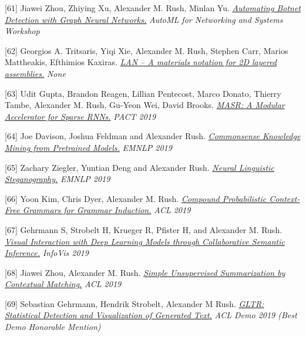 \documentclass[10pt]{article}
\begin{document}
[61] \ind Jiawei Zhou, Zhiying Xu, Alexander M. Rush, Minlan Yu. \emph{\href{ https://arxiv.org/pdf/2003.06344 }{ Automating Botnet Detection with Graph Neural Networks.} }\emph{ AutoML for Networking and Systems Workshop }

\medskip


[62] \ind Georgios A. Tritsaris, Yiqi Xie, Alexander M. Rush, Stephen Carr, Marios Mattheakis, Efthimios Kaxiras. \emph{\href{ https://arxiv.org/pdf/1910.03413 }{ LAN -- A materials notation for 2D layered assemblies.} }\emph{ None }

\medskip


[63] \ind Udit Gupta, Brandon Reagen, Lillian Pentecost, Marco Donato, Thierry Tambe, Alexander M. Rush, Gu-Yeon Wei, David Brooks. \emph{\href{ None }{ MASR: A Modular Accelerator for Sparse RNNs.} }\emph{ PACT 2019 }

\medskip


[64] \ind Joe Davison, Joshua Feldman and Alexander Rush. \emph{\href{ None }{ Commonsense Knowledge Mining from Pretrained Models.} }\emph{ EMNLP 2019 }

\medskip


[65] \ind Zachary Ziegler, Yuntian Deng and Alexander Rush. \emph{\href{ https://arxiv.org/abs/1909.01496 }{ Neural Linguistic Steganography.} }\emph{ EMNLP 2019 }

\medskip


[66] \ind Yoon Kim,  Chris Dyer, Alexander M. Rush. \emph{\href{ https://www.aclweb.org/anthology/P19-1228/ }{ Compound Probabilistic Context-Free Grammars for Grammar Induction.} }\emph{ ACL 2019 }

\medskip


[67] \ind Gehrmann S, Strobelt H, Krueger R, Pfister H, and Alexander M. Rush. \emph{\href{ https://arxiv.org/abs/1907.10739 }{ Visual Interaction with Deep Learning Models through Collaborative Semantic Inference.} }\emph{ InfoVis 2019 }

\medskip


[68] \ind Jiawei Zhou, Alexander M. Rush. \emph{\href{ https://www.aclweb.org/anthology/P19-1503 }{ Simple Unsupervised Summarization by Contextual Matching.} }\emph{ ACL 2019 }

\medskip


[69] \ind Sebastian Gehrmann, Hendrik Strobelt, Alexander M Rush. \emph{\href{ https://arxiv.org/abs/1906.04043 }{ GLTR: Statistical Detection and Visualization of Generated Text.} }\emph{ ACL Demo 2019 (Best Demo Honorable Mention) }
\end{document}
